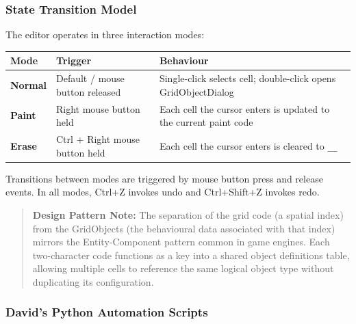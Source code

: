 \subsubsection{State Transition Model}\label{state-transition-model}

The editor operates in three interaction modes:

\begin{longtable}[]{@{}
  >{\raggedright\arraybackslash}p{}
  >{\raggedright\arraybackslash}p{}
  >{\raggedright\arraybackslash}p{}@{}}
\toprule\noalign{}
\begin{minipage}[b]{\linewidth}\raggedright
Mode
\end{minipage} & \begin{minipage}[b]{\linewidth}\raggedright
Trigger
\end{minipage} & \begin{minipage}[b]{\linewidth}\raggedright
Behaviour
\end{minipage} \\
\midrule\noalign{}
\endhead
\bottomrule\noalign{}
\endlastfoot
\textbf{Normal} & Default / mouse button released & Single-click selects
cell; double-click opens GridObjectDialog \\
\textbf{Paint} & Right mouse button held & Each cell the cursor enters
is updated to the current paint code \\
\textbf{Erase} & Ctrl + Right mouse button held & Each cell the cursor
enters is cleared to \texttt{\_\_} \\
\end{longtable}

Transitions between modes are triggered by mouse button press and
release events. In all modes, Ctrl+Z invokes undo and Ctrl+Shift+Z
invokes redo.

\begin{quote}
\textbf{Design Pattern Note:} The separation of the grid code (a spatial
index) from the GridObjects (the behavioural data associated with that
index) mirrors the Entity-Component pattern common in game engines. Each
two-character code functions as a key into a shared object definitions
table, allowing multiple cells to reference the same logical object type
without duplicating its configuration.
\end{quote}

\subsubsection{David's Python Automation
Scripts}\label{davids-python-automation-scripts}

